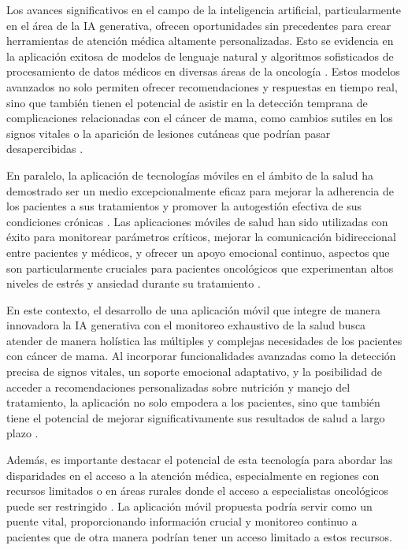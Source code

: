 Los avances significativos en el campo de la inteligencia artificial, particularmente en el área de la IA generativa, ofrecen oportunidades sin precedentes para crear herramientas de atención médica altamente personalizadas. Esto se evidencia en la aplicación exitosa de modelos de lenguaje natural y algoritmos sofisticados de procesamiento de datos médicos en diversas áreas de la oncología \parencite{ce2024}. Estos modelos avanzados no solo permiten ofrecer recomendaciones y respuestas en tiempo real, sino que también tienen el potencial de asistir en la detección temprana de complicaciones relacionadas con el cáncer de mama, como cambios sutiles en los signos vitales o la aparición de lesiones cutáneas que podrían pasar desapercibidas \parencite{naeem2022}.

En paralelo, la aplicación de tecnologías móviles en el ámbito de la salud ha demostrado ser un medio excepcionalmente eficaz para mejorar la adherencia de los pacientes a sus tratamientos y promover la autogestión efectiva de sus condiciones crónicas \parencite{masciantonio2017}. Las aplicaciones móviles de salud han sido utilizadas con éxito para monitorear parámetros críticos, mejorar la comunicación bidireccional entre pacientes y médicos, y ofrecer un apoyo emocional continuo, aspectos que son particularmente cruciales para pacientes oncológicos que experimentan altos niveles de estrés y ansiedad durante su tratamiento \parencite{leung2022}.

En este contexto, el desarrollo de una aplicación móvil que integre de manera innovadora la IA generativa con el monitoreo exhaustivo de la salud busca atender de manera holística las múltiples y complejas necesidades de los pacientes con cáncer de mama. Al incorporar funcionalidades avanzadas como la detección precisa de signos vitales, un soporte emocional adaptativo, y la posibilidad de acceder a recomendaciones personalizadas sobre nutrición y manejo del tratamiento, la aplicación no solo empodera a los pacientes, sino que también tiene el potencial de mejorar significativamente sus resultados de salud a largo plazo \parencite{beltran2023}.

Además, es importante destacar el potencial de esta tecnología para abordar las disparidades en el acceso a la atención médica, especialmente en regiones con recursos limitados o en áreas rurales donde el acceso a especialistas oncológicos puede ser restringido \parencite{smith2023}. La aplicación móvil propuesta podría servir como un puente vital, proporcionando información crucial y monitoreo continuo a pacientes que de otra manera podrían tener un acceso limitado a estos recursos.

